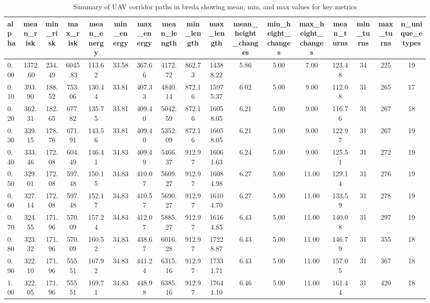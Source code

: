 \begin{table}
\caption{Summary of UAV corridor paths in breda showing mean, min, and max values for key metrics}
\label{tab:breda_summary_detailed}
\begin{tabular}{lcccccccccccccccc}
\toprule
alpha & mean_risk & min_risk & max_risk & mean_energy & min_energy & max_energy & mean_length & min_length & max_length & mean_height_changes & min_height_changes & max_height_changes & mean_turns & min_turns & max_turns & n_unique_etypes \\
\midrule
0.00 & 1372.60 & 234.49 & 6045.83 & 113.62 & 33.58 & 367.66 & 4172.72 & 862.73 & 14388.22 & 5.86 & 5.00 & 7.00 & 123.48 & 34 & 225 & 19 \\
0.10 & 393.90 & 188.52 & 753.06 & 130.44 & 33.81 & 407.33 & 4840.14 & 872.16 & 15975.37 & 6.02 & 5.00 & 9.00 & 112.08 & 31 & 265 & 17 \\
0.20 & 362.31 & 182.65 & 677.82 & 135.75 & 33.81 & 409.40 & 5042.59 & 872.16 & 16058.05 & 6.21 & 5.00 & 9.00 & 116.76 & 31 & 267 & 18 \\
0.30 & 339.15 & 178.76 & 671.91 & 143.56 & 33.81 & 409.40 & 5352.09 & 872.16 & 16058.05 & 6.21 & 5.00 & 9.00 & 122.97 & 31 & 267 & 19 \\
0.40 & 333.46 & 172.08 & 604.49 & 146.41 & 34.83 & 409.49 & 5466.37 & 912.97 & 16061.63 & 6.24 & 5.00 & 9.00 & 125.51 & 31 & 272 & 19 \\
0.50 & 329.01 & 172.08 & 597.48 & 150.15 & 34.83 & 410.07 & 5609.27 & 912.97 & 16084.98 & 6.27 & 5.00 & 11.00 & 129.14 & 31 & 276 & 19 \\
0.60 & 327.14 & 172.08 & 597.48 & 152.17 & 34.83 & 410.57 & 5690.27 & 912.97 & 16104.70 & 6.27 & 5.00 & 11.00 & 133.59 & 31 & 278 & 19 \\
0.70 & 324.55 & 171.96 & 570.09 & 157.24 & 34.83 & 412.07 & 5885.27 & 912.97 & 16164.85 & 6.43 & 5.00 & 11.00 & 140.08 & 31 & 297 & 19 \\
0.80 & 323.32 & 171.96 & 570.09 & 160.52 & 34.83 & 438.67 & 6016.28 & 912.97 & 17228.87 & 6.43 & 5.00 & 11.00 & 146.79 & 31 & 355 & 18 \\
0.90 & 322.10 & 171.96 & 555.51 & 167.92 & 34.83 & 441.24 & 6315.16 & 912.97 & 17331.71 & 6.43 & 5.00 & 11.00 & 157.05 & 31 & 367 & 18 \\
1.00 & 322.05 & 171.96 & 555.51 & 169.71 & 34.83 & 448.98 & 6385.16 & 912.97 & 17641.10 & 6.46 & 5.00 & 11.00 & 161.44 & 31 & 420 & 18 \\
\bottomrule
\end{tabular}
\end{table}
